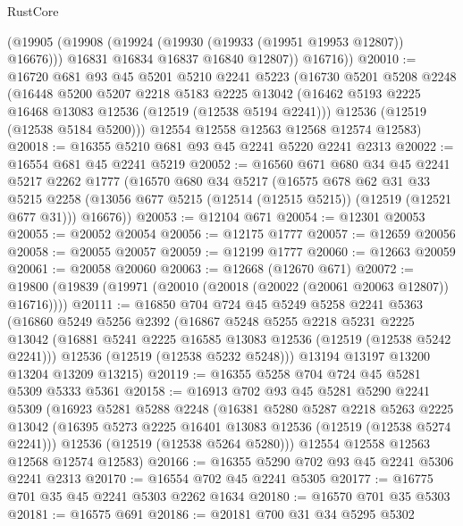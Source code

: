 \begin{lexlean}{RustCore}
\begin{coremodule}
          (@19905
            (@19908 (@19924 (@19930 (@19933 (@19951 @19953 @12807)) @16676)))
            @16831
            @16834
            @16837
            @16840
            @12807))
        @16716))
@20010 := @16720
    @681
    @93
    @45
    @5201
    @5210
    @2241
    @5223
    (@16730
      @5201
      @5208
      @2248
      (@16448
        @5200
        @5207
        @2218
        @5183
        @2225
        @13042
        (@16462 @5193 @2225 @16468 @13083 @12536 (@12519 (@12538 @5194 @2241)))
        @12536
        (@12519 (@12538 @5184 @5200)))
      @12554
      @12558
      @12563
      @12568
      @12574
      @12583)
@20018 := @16355 @5210 @681 @93 @45 @2241 @5220 @2241 @2313
@20022 := @16554 @681 @45 @2241 @5219
@20052 := @16560
    @671
    @680
    @34
    @45
    @2241
    @5217
    @2262
    @1777
    (@16570
      @680
      @34
      @5217
      (@16575
        @678
        @62
        @31
        @33
        @5215
        @2258
        (@13056 @677 @5215 (@12514 (@12515 @5215)) (@12519 (@12521 @677 @31)))
        @16676))
@20053 := @12104 @671
@20054 := @12301 @20053
@20055 := @20052 @20054
@20056 := @12175 @1777
@20057 := @12659 @20056
@20058 := @20055 @20057
@20059 := @12199 @1777
@20060 := @12663 @20059
@20061 := @20058 @20060
@20063 := @12668 (@12670 @671)
@20072 := @19800 (@19839 (@19971 (@20010 (@20018 (@20022 (@20061 @20063 @12807)) @16716))))
@20111 := @16850
    @704
    @724
    @45
    @5249
    @5258
    @2241
    @5363
    (@16860
      @5249
      @5256
      @2392
      (@16867
        @5248
        @5255
        @2218
        @5231
        @2225
        @13042
        (@16881 @5241 @2225 @16585 @13083 @12536 (@12519 (@12538 @5242 @2241)))
        @12536
        (@12519 (@12538 @5232 @5248)))
      @13194
      @13197
      @13200
      @13204
      @13209
      @13215)
@20119 := @16355 @5258 @704 @724 @45 @5281 @5309 @5333 @5361
@20158 := @16913
    @702
    @93
    @45
    @5281
    @5290
    @2241
    @5309
    (@16923
      @5281
      @5288
      @2248
      (@16381
        @5280
        @5287
        @2218
        @5263
        @2225
        @13042
        (@16395 @5273 @2225 @16401 @13083 @12536 (@12519 (@12538 @5274 @2241)))
        @12536
        (@12519 (@12538 @5264 @5280)))
      @12554
      @12558
      @12563
      @12568
      @12574
      @12583)
@20166 := @16355 @5290 @702 @93 @45 @2241 @5306 @2241 @2313
@20170 := @16554 @702 @45 @2241 @5305
@20177 := @16775 @701 @35 @45 @2241 @5303 @2262 @1634
@20180 := @16570 @701 @35 @5303
@20181 := @16575 @691
@20186 := @20181 @700 @31 @34 @5295 @5302

\end{coremodule}
\end{lexlean}
